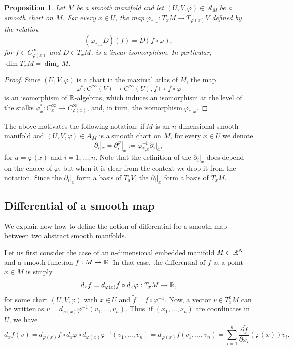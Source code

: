 \documentclass[11pt,a4paper]{book}
\newtheorem{prop}[thm]{Proposition}
\theoremstyle{remark} \newtheorem{rmk}[thm]{Remark}
\theoremstyle{definition} \newtheorem{defn}[thm]{Definition}
\theoremstyle{definition} \newtheorem{ex}[thm]{Example}
\theoremstyle{definition} \newtheorem{ej}[thm]{Exercise}
\begin{document}
\begin{prop}
  Let $M$ be a smooth manifold and let $(U,V,\varphi) \in \bar{\mathcal{A}}_M$ be a smooth chart on $M$. For every $x\in U$, the map $\varphi_{*,x}:T_xM\rightarrow T_{\varphi(x)} V$ defined by the relation
  \begin{equation*}
(\varphi_{*,x} D)(f) = D(f\circ \varphi),
  \end{equation*}
  for $f\in C^\infty_{\varphi(x)}$ and $D \in T_xM$, is a linear isomorphism. In particular, $\dim T_xM = \dim_x M$.
\end{prop}
\begin{proof}
  Since $(U,V,\varphi)$ is a chart in the maximal atlas of $M$, the map
  \begin{equation*}
\varphi^*: C^\infty(V) \rightarrow C^\infty(U), f \mapsto f\circ \varphi
  \end{equation*}
  is an isomorphism of $\mathbb R$-algebras, which induces an isomorphism at the level of the stalks $\varphi^*_x:C^\infty_x \rightarrow C^\infty_{\varphi(x)}$, and, in turn, the isomorphism $\varphi_{*,x}$.
\end{proof}

The above motivates the following notation: if $M$ is an $n$-dimensional smooth manifold and $(U,V,\varphi) \in \bar{A}_M$ is a smooth chart on $M$, for every $x\in U$ we denote
\begin{equation*}
\partial_{i}|_x = \partial_{i}^{\varphi}|_x := \varphi_{*,x}^{-1} \partial_i|_{a},
\end{equation*}
for $a=\varphi(x)$ and $i=1,\dots,n$. Note that the definition of the $\partial_i|_x$ does depend on the choice of $\varphi$, but when it is clear from the context we drop it from the notation. Since the $\partial_i|_{a}$ form a basis of $T_a V$, the $\partial_i|_x$ form a basis of $T_x M$.

\subsection{Differential of a smooth map}
We explain now how to define the notion of differential for a smooth map between two abstract smooth manifolds.

Let us first consider the case of an $n$-dimensional embedded manifold $M\subset \mathbb R^N$ and a smooth function $f:M\rightarrow \mathbb R$. In that case, the differential of $f$ at a point $x\in M$ is simply
\begin{equation*}
d_xf=d_{\varphi(x)} \tilde{f} \circ d_x \varphi: T_xM \rightarrow \mathbb R,
\end{equation*}
for some chart $(U,V,\varphi)$ with $x\in U$ and $\tilde{f}=f\circ \varphi^{-1}$. Now, a vector $v \in T^e_xM$ can be written as $v=d_{\varphi(x)}\varphi^{-1}(v_1,\dots,v_n)$. Thus, if $(x_1,\dots,x_n)$ are coordinates in $U$, we have
\begin{equation*}
d_xf (v)= d_{\varphi(x)} \tilde{f} \circ d_x\varphi \circ d_{\varphi(x)}\varphi^{-1}(v_1,\dots,v_n) = d_{\varphi(x)}\tilde{f}(v_1,\dots,v_n) = \sum_{i=1}^n \frac{\partial \tilde{f}}{\partial x_i}(\varphi(x)) v_i.
\end{equation*}
\end{document}
